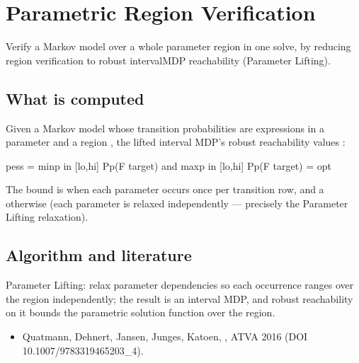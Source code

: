 \documentclass[a4paper,10pt,english]{sphinxmanual}
\begin{document}
\sphinxstepscope


\section{Parametric Region Verification}
\label{\detokenize{manual/parametric:parametric-region-verification}}\label{\detokenize{manual/parametric::doc}}
\sphinxAtStartPar
Verify a  Markov model over a whole parameter region in one solve, by
reducing region verification to robust interval\sphinxhyphen{}MDP reachability (Parameter Lifting).


\subsection{What is computed}
\label{\detokenize{manual/parametric:what-is-computed}}
\sphinxAtStartPar
Given a Markov model whose transition probabilities are expressions in a parameter 
and a region , the lifted interval MDP’s robust 
reachability values :

\begin{sphinxVerbatim}[commandchars=\\\{\}]
pess  \PYGZlt{}=  min\PYGZus{}\PYGZob{}p in [lo,hi]\PYGZcb{} P\PYGZus{}p(F target)   and   max\PYGZus{}\PYGZob{}p in [lo,hi]\PYGZcb{} P\PYGZus{}p(F target)  \PYGZlt{}=  opt
\end{sphinxVerbatim}

\sphinxAtStartPar
The bound is  when each parameter occurs once per transition row, and a
 otherwise (each parameter  is relaxed
independently — precisely the Parameter Lifting relaxation).


\subsection{Algorithm and literature}
\label{\detokenize{manual/parametric:algorithm-and-literature}}
\sphinxAtStartPar
Parameter Lifting: relax parameter dependencies so each occurrence ranges over the
region independently; the result is an interval MDP, and robust reachability on it
bounds the parametric solution function over the region.
\begin{itemize}
\item {} 
\sphinxAtStartPar
Quatmann, Dehnert, Jansen, Junges, Katoen, , ATVA 2016 (DOI 10.1007/978\sphinxhyphen{}3\sphinxhyphen{}319\sphinxhyphen{}46520\sphinxhyphen{}3\_4).

\end{itemize}
\end{document}
